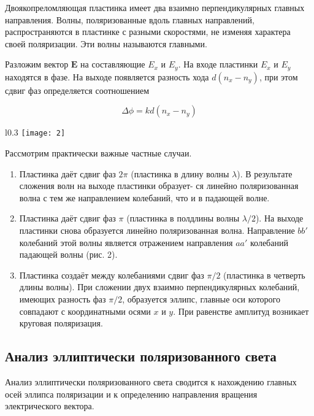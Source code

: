 Двоякопреломляющая пластинка имеет два взаимно перпендикулярных главных направления. Волны, поляризованные вдоль главных направлений, распространяются в пластинке с разными скоростями, не изменяя характера своей поляризации. Эти волны называются главными. 

Разложим вектор $ \mathbf{E} $ на составляющие $ E_x $ и $ E_y $. На входе пластинки $ E_x $ и $ E_y $ находятся в фазе. На выходе появляется разность хода $ d(n_x - n_y) $, при этом сдвиг фаз определяется соотношением

\begin{equation*}\label{}
\Delta \phi  = k d(n_x - n_y)
\end{equation*}

\begin{wrapfigure}{l}{0.3\linewidth}
	\texttt{[image: 2]}
	\label{ris 2}
\end{wrapfigure}


Рассмотрим практически важные частные случаи.

\begin{enumerate}
	
	\item Пластинка даёт сдвиг фаз $ 2\pi $ (пластинка в длину волны $ \lambda $). В результате сложения волн на выходе пластинки образует-
	ся линейно поляризованная волна с тем же направлением колебаний, что и в падающей волне.
	
	\item Пластинка даёт сдвиг фаз $ \pi $ (пластинка в полдлины волны $ \lambda / 2 $). На выходе пластинки снова образуется линейно поляризованная волна. Направление $ bb' $ колебаний этой волны является отражением направления $ aa' $ колебаний падающей волны (рис. 2).
	
	\item Пластинка создаёт между колебаниями сдвиг фаз $ \pi/2 $ (пластинка
	в четверть длины волны). При сложении двух взаимно перпендикулярных колебаний, имеющих разность фаз $ \pi/2 $, образуется эллипс, главные оси которого совпадают с координатными осями $ x $ и $ y $. При равенстве амплитуд возникает круговая поляризация.
	
\end{enumerate}


\subsection{Анализ эллиптически поляризованного света}

Анализ эллиптически поляризованного света сводится к нахождению главных осей
эллипса поляризации и к определению направления вращения электрического вектора.

